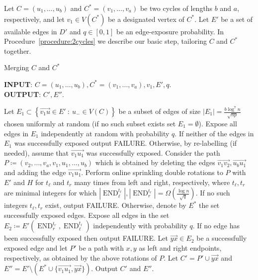 \documentclass{article}
\DeclareMathOperator{\END}{END}
\begin{document}
	Let $C = (u_1, \ldots, u_b)$ and $C^* = (v_1, \ldots, v_a)$ be two cycles of lengths $b$ and $a$, respectively, and let $v_1 \in V(C^*)$ be a designated vertex of $C^*$.
	Let $E'$ be a set of available edges in $D'$ and $q \in [0,1]$ be an edge-exposure probability.
	In Procedure~\ref{procedure:2cycles} we describe our basic step, tailoring $C$ and $C^*$ together.
	\begin{algorithm}
		\caption{Merging $C$ and $C^*$}
		\label{procedure:2cycles}
		\textbf{INPUT}: $C = (u_1, \ldots, u_b), C^* = (v_1, \ldots, v_a), v_1, E', q$. \\
		\textbf{OUTPUT}: $C', E''$.
		\begin{algorithmic}[1]
			\STATE Let $E_1 \subset \left\{\overrightarrow{v_1u} \in E' ~:~ u_- \in V(C) \right\}$ be a subset of edges of size $|E_1| = \frac{b\log^7 n}{\sqrt{np}}$ chosen uniformly at random (if no such subset exists set $E_1 = \emptyset$).
			Expose all edges in $E_1$ independently at random with probability $q$.
			\STATE If neither of the edges in $E_1$ was successfully exposed output FAILURE.
			Otherwise, by re-labelling (if needed), assume that $\overrightarrow{v_1 u_1}$ was successfully exposed.
			\STATE Consider the path $P \coloneqq \left(v_2, \ldots, v_a, v_1, u_1, \ldots, u_b \right)$ which is obtained by deleting the edges $\overrightarrow{v_1v_2}, \overrightarrow{u_b u_1}$ and adding the edge $\overrightarrow{v_1u_1}$.
			\STATE Perform online sprinkling double rotations to $P$ with $E'$ and $H$ for $t_{\ell}$ and $t_r$ many times from left and right, respectively, where $t_{\ell}, t_r$ are minimal integers for which $\left|\END_{\ell}^{t_{\ell}} \right|, \left|\END_r^{t_r} \right| = \Omega\left(\frac{\log n}{\sqrt{q}} \right)$.
			If no such integers $t_{\ell}, t_r$ exist, output FAILURE.
			Otherwise, denote by $E^*$ the set successfully exposed edges.
			\STATE Expose all edges in the set $E_2 \coloneqq E'\left(\END_r^{t_r}, \END_{\ell}^{t_{\ell}} \right)$ independently with probability $q$.
			If no edge has been successfully exposed then output FAILURE.
			\STATE Let $\overrightarrow{yx} \in E_2$ be a successfully exposed edge and let $P'$ be a path with $x,y$ as left and right endpoints, respectively, as obtained by the above rotations of $P$.
			Let $C' = P' \cup \overrightarrow{yx}$ and $E'' = E'\setminus\left(E^* \cup \{\overrightarrow{v_1u_1}, \overrightarrow{yx}\} \right)$.
			\STATE Output $C'$ and $E''$.
		\end{algorithmic}
	\end{algorithm}
	
\end{document}
